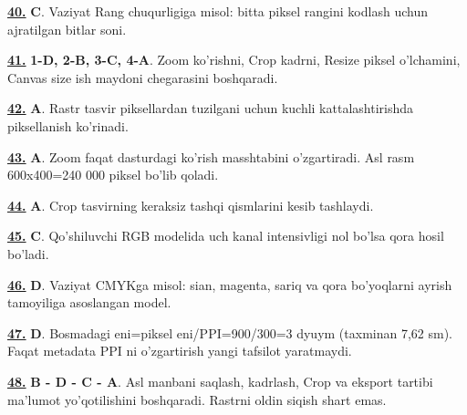 \documentclass[10pt,a4paper,oneside]{article}
\begin{document}
\par\vspace{3mm}
\noindent\hyperlink{q40}{\textbf{40.}} \textbf{C}.  Vaziyat Rang chuqurligiga misol: bitta piksel rangini kodlash uchun ajratilgan bitlar soni.
\par\vspace{3mm}
\noindent\hyperlink{q41}{\textbf{41.}} \textbf{1-D, 2-B, 3-C, 4-A}.  Zoom ko'rishni, Crop kadrni, Resize piksel o'lchamini, Canvas size ish maydoni chegarasini boshqaradi.
\par\vspace{3mm}
\noindent\hyperlink{q42}{\textbf{42.}} \textbf{A}.  Rastr tasvir piksellardan tuzilgani uchun kuchli kattalashtirishda piksellanish ko'rinadi.
\par\vspace{3mm}
\noindent\hyperlink{q43}{\textbf{43.}} \textbf{A}.  Zoom faqat dasturdagi ko'rish masshtabini o'zgartiradi. Asl rasm 600x400=240 000 piksel bo'lib qoladi.
\par\vspace{3mm}
\noindent\hyperlink{q44}{\textbf{44.}} \textbf{A}.  Crop tasvirning keraksiz tashqi qismlarini kesib tashlaydi.
\par\vspace{3mm}
\noindent\hyperlink{q45}{\textbf{45.}} \textbf{C}.  Qo'shiluvchi RGB modelida uch kanal intensivligi nol bo'lsa qora hosil bo'ladi.
\par\vspace{3mm}
\noindent\hyperlink{q46}{\textbf{46.}} \textbf{D}.  Vaziyat CMYKga misol: sian, magenta, sariq va qora bo'yoqlarni ayrish tamoyiliga asoslangan model.
\par\vspace{3mm}
\noindent\hyperlink{q47}{\textbf{47.}} \textbf{D}.  Bosmadagi eni=piksel eni/PPI=900/300=3 dyuym (taxminan 7,62 sm). Faqat metadata PPI ni o'zgartirish yangi tafsilot yaratmaydi.
\par\vspace{3mm}
\noindent\hyperlink{q48}{\textbf{48.}} \textbf{B - D - C - A}.  Asl manbani saqlash, kadrlash, Crop va eksport tartibi ma'lumot yo'qotilishini boshqaradi. Rastrni oldin siqish shart emas.
\par\vspace{3mm}
\end{document}
